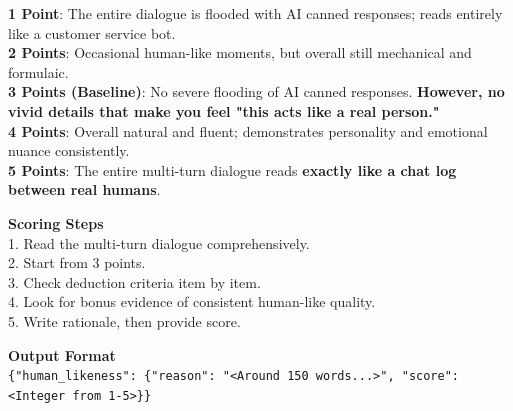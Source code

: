\begin{tcolorbox}[
    breakable,
    colback=MyWordColor1,
    colframe=black,
    boxrule=0.6pt,
    arc=1.5mm,
    title={\textbf{DynSess-Eval Prompt: Human-Likeness}},
    fontupper=\small
]
\textbf{1 Point}: The entire dialogue is flooded with AI canned responses; reads entirely like a customer service bot.\\
\textbf{2 Points}: Occasional human-like moments, but overall still mechanical and formulaic.\\
\textbf{3 Points (Baseline)}: No severe flooding of AI canned responses. \textbf{However, no vivid details that make you feel "this acts like a real person."}\\
\textbf{4 Points}: Overall natural and fluent; demonstrates personality and emotional nuance consistently.\\
\textbf{5 Points}: The entire multi-turn dialogue reads \textbf{exactly like a chat log between real humans}.

\textbf{Scoring Steps}\\
1. Read the multi-turn dialogue comprehensively.\\
2. Start from 3 points.\\
3. Check deduction criteria item by item.\\
4. Look for bonus evidence of consistent human-like quality.\\
5. Write rationale, then provide score.

\textbf{Output Format}\\
\texttt{\{"human\_likeness": \{"reason": "<Around 150 words...>", "score": <Integer from 1-5>\}\}}
\end{tcolorbox}

